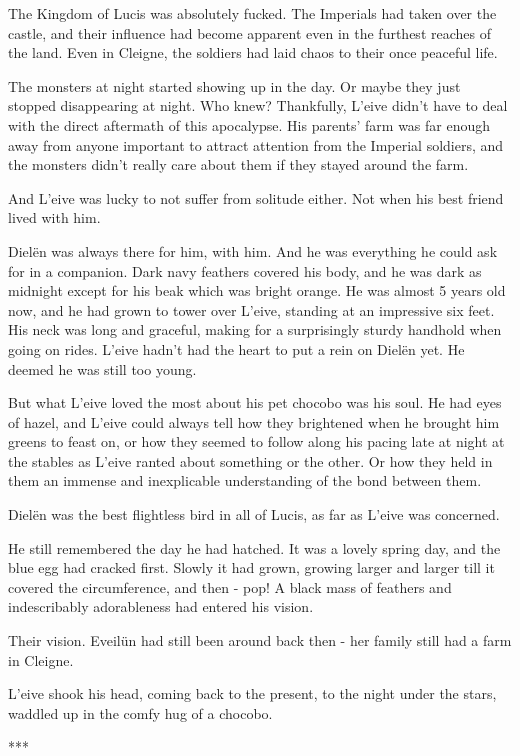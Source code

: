 \noindent The Kingdom of Lucis was absolutely fucked. The Imperials had taken over the castle, and their influence had become apparent even in the furthest reaches of the land. Even in Cleigne, the soldiers had laid chaos to their once peaceful life.

The monsters at night started showing up in the day. Or maybe they just stopped disappearing at night. Who knew? Thankfully, L'eive didn’t have to deal with the direct aftermath of this apocalypse. His parents’ farm was far enough away from anyone important to attract attention from the Imperial soldiers, and the monsters didn’t really care about them if they stayed around the farm.
 
And L'eive was lucky to not suffer from solitude either. Not when his best friend lived with him.

Dielën was always there for him, with him. And he was everything he could ask for in a companion. Dark navy feathers covered his body, and he was dark as midnight except for his beak which was bright orange. He was almost 5 years old now, and he had grown to tower over L'eive, standing at an impressive six feet. His neck was long and graceful, making for a surprisingly sturdy handhold when going on rides. L'eive hadn’t had the heart to put a rein on Dielën yet. He deemed he was still too young.

But what L’eive loved the most about his pet chocobo was his soul. He had eyes of hazel, and L'eive could always tell how they brightened when he brought him greens to feast on, or how they seemed to follow along his pacing late at night at the stables as L'eive ranted about something or the other. Or how they held in them an immense and inexplicable understanding of the bond between them.

Dielën was the best flightless bird in all of Lucis, as far as L'eive was concerned.

He still remembered the day he had hatched. It was a lovely spring day, and the blue egg had cracked first. Slowly it had grown, growing larger and larger till it covered the circumference, and then - pop! A black mass of feathers and indescribably adorableness had entered his vision. 

Their vision. Eveilün had still been around back then - her family still had a farm in Cleigne.

L'eive shook his head, coming back to the present, to the night under the stars, waddled up in the comfy hug of a chocobo.

\begin{center}
    ***
\end{center}

